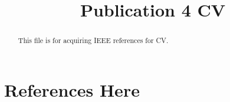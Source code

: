 \documentclass[letterpaper, 10 pt, conference]{ieeeconf}  %
\title{\LARGE \bf
Publication 4 CV
}
\author{
}
\begin{document}
\maketitle
\thispagestyle{empty}
\pagestyle{empty}


\begin{abstract}
This file is for acquiring IEEE references for CV.
\end{abstract}

\section*{References Here}
\cite{lo2026fly}  
\cite{weaver2026omnidirectional} 
\cite{liu2026embodied}
\cite{lo2024experimental} 
\cite{lo2024adaptive}
\cite{lo2023landing}
\cite{lo2021dynamic}

\cite{yang2025fixed} 
\cite{yang2025hierarchical}


\addtolength{\textheight}{-0cm}   %




















\end{document}
